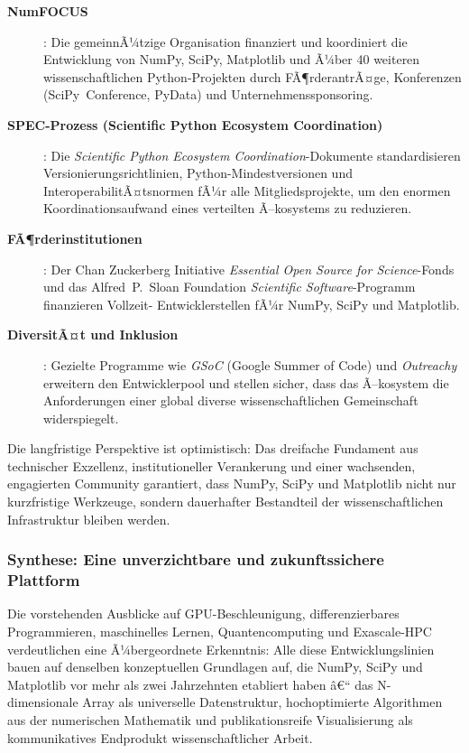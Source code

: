 \documentclass[12pt, a4paper]{article}
\begin{document}
\begin{description}
  \item[\textbf{NumFOCUS}]: Die gemeinnÃ¼tzige Organisation finanziert und
    koordiniert die Entwicklung von NumPy, SciPy, Matplotlib und Ã¼ber
    40 weiteren wissenschaftlichen Python-Projekten durch FÃ¶rderantrÃ¤ge,
    Konferenzen (SciPy~Conference, PyData) und Unternehmenssponsoring.

  \item[\textbf{SPEC-Prozess (Scientific Python Ecosystem Coordination)}]:
    Die \emph{Scientific Python Ecosystem Coordination}-Dokumente
    standardisieren Versionierungsrichtlinien, Python-Mindestversionen
    und InteroperabilitÃ¤tsnormen fÃ¼r alle Mitgliedsprojekte, um den
    enormen Koordinationsaufwand eines verteilten Ã–kosystems zu reduzieren.

  \item[\textbf{FÃ¶rderinstitutionen}]: Der Chan Zuckerberg Initiative
    \emph{Essential Open Source for Science}-Fonds und das Alfred~P.~Sloan
    Foundation \emph{Scientific Software}-Programm finanzieren Vollzeit-
    Entwicklerstellen fÃ¼r NumPy, SciPy und Matplotlib.

  \item[\textbf{DiversitÃ¤t und Inklusion}]: Gezielte Programme wie
    \emph{GSoC} (Google Summer of Code) und \emph{Outreachy} erweitern
    den Entwicklerpool und stellen sicher, dass das Ã–kosystem die
    Anforderungen einer global diverse wissenschaftlichen Gemeinschaft
    widerspiegelt.
\end{description}

Die langfristige Perspektive ist optimistisch: Das dreifache Fundament aus
technischer Exzellenz, institutioneller Verankerung und einer wachsenden,
engagierten Community garantiert, dass NumPy, SciPy und Matplotlib nicht
nur kurzfristige Werkzeuge, sondern dauerhafter Bestandteil der
wissenschaftlichen Infrastruktur bleiben werden.

\subsubsection{Synthese: Eine unverzichtbare und zukunftssichere Plattform}
\label{subsubsec:synthese}

Die vorstehenden Ausblicke auf GPU-Beschleunigung, differenzierbares
Programmieren, maschinelles Lernen, Quantencomputing und Exascale-HPC
verdeutlichen eine Ã¼bergeordnete Erkenntnis: Alle diese Entwicklungslinien
bauen auf denselben konzeptuellen Grundlagen auf, die NumPy, SciPy und
Matplotlib vor mehr als zwei Jahrzehnten etabliert haben â€“ das
N-dimensionale Array als universelle Datenstruktur, hochoptimierte
Algorithmen aus der numerischen Mathematik und publikationsreife
Visualisierung als kommunikatives Endprodukt wissenschaftlicher Arbeit.
\end{document}
